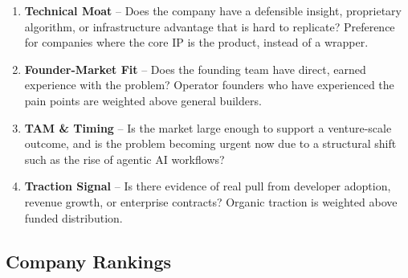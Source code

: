 \documentclass[11pt, letterpaper]{article}
\begin{document}
\begin{enumerate}
  \item \textbf{Technical Moat} -- Does the company have a defensible insight,
    proprietary algorithm, or infrastructure advantage that is hard to replicate?
    Preference for companies where the core IP is the product, instead of a wrapper.

  \item \textbf{Founder-Market Fit} -- Does the founding team have direct, earned
    experience with the problem? Operator founders who have experienced the pain
    points are weighted above general builders.

  \item \textbf{TAM \& Timing} -- Is the market large enough to support a
    venture-scale outcome, and is the problem becoming urgent now due to a
    structural shift such as the rise of agentic AI workflows?

  \item \textbf{Traction Signal} -- Is there evidence of real pull from developer
    adoption, revenue growth, or enterprise contracts? Organic traction is
    weighted above funded distribution.
\end{enumerate}

\subsection{Company Rankings}
\end{document}

